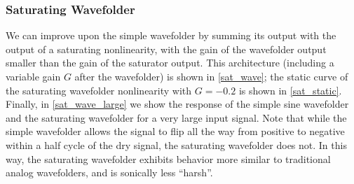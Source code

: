 \documentclass[twoside,a4paper]{article}
\begin{document}
\subsubsection{Saturating Wavefolder}
%
We can improve upon the simple wavefolder by summing
its output with the output of a saturating nonlinearity, with the gain
of the wavefolder output smaller than the gain of the saturator output.
This architecture (including a variable gain $G$ after the wavefolder) is
shown in \cref{sat_wave}; the static curve of the saturating wavefolder
nonlinearity with $G=-0.2$ is shown in \cref{sat_static}. Finally, in
\cref{sat_wave_large} we show the response of the simple sine wavefolder
and the saturating wavefolder for a very large input signal. Note that
while the simple wavefolder allows the signal to flip all the way from
positive to negative within a half cycle of the dry signal, the
saturating wavefolder does not. In this way, the saturating wavefolder
exhibits behavior more similar to traditional analog wavefolders, and
is sonically less ``harsh''.
%
\end{document}
